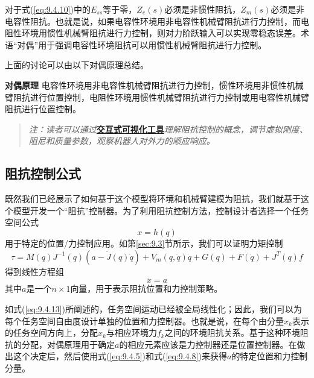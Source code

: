 \documentclass[12pt,a4paper]{ctexart}
\begin{document}
对于式(\ref{eq:9.4.10})中的$E_{ss}$等于零，$Z_e(s)$必须是非惯性阻抗，$Z_m(s)$必须是非电容性阻抗。也就是说，如果电容性环境用非电容性机械臂阻抗进行力控制，而电阻性环境用惯性机械臂阻抗进行力控制，则对力阶跃输入可以实现零稳态误差。术语``对偶''用于强调电容性环境阻抗可以用惯性机械臂阻抗进行力控制。

上面的讨论可以由以下对偶原理总结。

\textbf{对偶原理} 电容性环境用非电容性机械臂阻抗进行力控制，惯性环境用非惯性机械臂阻抗进行位置控制，电阻性环境用惯性机械臂阻抗进行力控制或用电容性机械臂阻抗进行位置控制。

\begin{quote}
\textit{注：读者可以通过}\href{https://frankjie09.github.io/Robot-Manipulator-Control-CN/figures/Impedance_Control.html}{\textbf{交互式可视化工具}}\textit{理解阻抗控制的概念，调节虚拟刚度、阻尼和质量参数，观察机器人对外力的顺应响应。}
\end{quote}

\subsection{阻抗控制公式}

既然我们已经展示了如何基于这个模型将环境和机械臂建模为阻抗，我们就基于这个模型开发一个``阻抗''控制器。为了利用阻抗控制方法，控制设计者选择一个任务空间公式
\begin{equation}\label{eq:9.4.11}
x = h(q)
\end{equation}
用于特定的位置/力控制应用。如第\ref{sec:9.3}节所示，我们可以证明力矩控制
\begin{equation}\label{eq:9.4.12}
\tau = M(q)J^{-1}(q)(a - \dot{J}(q)\dot{q}) + V_m(q, \dot{q})\dot{q} + G(q) + F(\dot{q}) + J^T(q)f
\end{equation}
得到线性方程组
\begin{equation}\label{eq:9.4.13}
\ddot{x} = a
\end{equation}
其中$a$是一个$n \times 1$向量，用于表示阻抗位置和力控制策略。

如式(\ref{eq:9.4.13})所阐述的，任务空间运动已经被全局线性化；因此，我们可以为每个任务空间自由度设计单独的位置和力控制器。也就是说，在每个由分量$x_k$表示的任务空间方向上，分配$x_k$与相应环境力$f_k$之间的环境阻抗关系。基于这种环境阻抗的分配，对偶原理用于确定$a$的相应元素应该是力控制器还是位置控制器。在做出这个决定后，然后使用式(\ref{eq:9.4.5})和式(\ref{eq:9.4.8})来获得$a$的特定位置和力控制分量。
\end{document}
